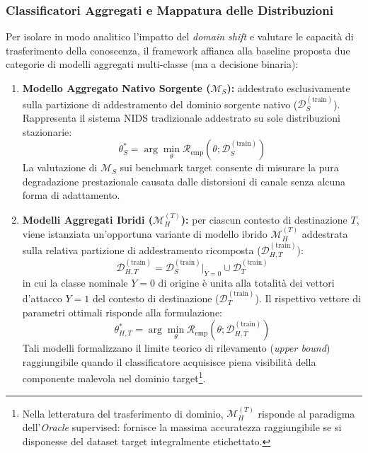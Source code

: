 \subsubsection{Classificatori Aggregati e Mappatura delle Distribuzioni}
\label{subsubsec:classificatori_aggregati}
Per isolare in modo analitico l'impatto del \textit{domain shift} e valutare le capacità di trasferimento della conoscenza, il framework affianca alla baseline proposta due categorie di modelli aggregati multi-classe (ma a decisione binaria):
\begin{enumerate}
    \item \textbf{Modello Aggregato Nativo Sorgente ($\mathcal{M}_{S}$):}
    addestrato esclusivamente sulla partizione di addestramento del dominio sorgente nativo ($\mathcal{D}_{S}^{(\text{train})}$). Rappresenta il sistema NIDS tradizionale addestrato su sole distribuzioni stazionarie:
    \begin{equation}
        \theta_{S}^* = \arg\min_\theta \mathcal{R}_{\text{emp}}\left(\theta; \mathcal{D}_{S}^{(\text{train})}\right)
        \label{eq:ms_optimization}
    \end{equation}
    La valutazione di $\mathcal{M}_{S}$ sui benchmark target consente di misurare la pura degradazione prestazionale causata dalle distorsioni di canale senza alcuna forma di adattamento.
    \item \textbf{Modelli Aggregati Ibridi ($\mathcal{M}_{H}^{(T)}$):}
    per ciascun contesto di destinazione $T$, viene istanziata un'opportuna variante di modello ibrido $\mathcal{M}_{H}^{(T)}$ addestrata sulla relativa partizione di addestramento ricomposta ($\mathcal{D}_{H, T}^{(\text{train})}$):
    \begin{equation}
        \mathcal{D}_{H, T}^{(\text{train})} = \mathcal{D}_{S}^{(\text{train})}\Big|_{Y=0} \cup \mathcal{D}_{T}^{(\text{train})}
        \label{eq:dh_composition}
    \end{equation}
in cui la classe nominale $Y=0$ di origine è unita alla totalità dei vettori d'attacco $Y=1$ del contesto di destinazione ($\mathcal{D}_{T}^{(\text{train})}$). Il rispettivo vettore di parametri ottimali risponde alla formulazione:
    \begin{equation}
        \theta_{H, T}^* = \arg\min_\theta \mathcal{R}_{\text{emp}}\left(\theta; \mathcal{D}_{H, T}^{(\text{train})}\right)
        \label{eq:mh_optimization}
    \end{equation}
    Tali modelli formalizzano il limite teorico di rilevamento (\textit{upper bound}) raggiungibile quando il classificatore acquisisce piena visibilità della componente malevola nel dominio target\footnote{Nella letteratura del trasferimento di dominio, $\mathcal{M}_{H}^{(T)}$ risponde al paradigma dell'\textit{Oracle} supervised: fornisce la massima accuratezza raggiungibile se si disponesse del dataset target integralmente etichettato.}.
\end{enumerate}

